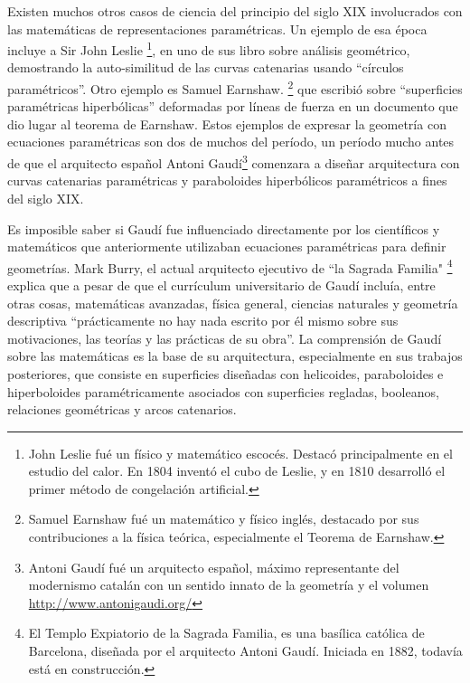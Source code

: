 Existen muchos otros casos de ciencia del principio del siglo XIX involucrados con las matemáticas de representaciones paramétricas. Un ejemplo de esa época incluye a Sir John Leslie \footnote{John Leslie fué un físico y matemático escocés. Destacó principalmente en el estudio del calor. En 1804 inventó el cubo de Leslie, y en 1810 desarrolló el primer método de congelación artificial.}, en uno de sus libro sobre análisis geométrico, demostrando la auto-similitud de las curvas catenarias usando ``círculos paramétricos''. Otro ejemplo es Samuel Earnshaw. \footnote{Samuel Earnshaw fué un matemático y físico inglés, destacado por sus contribuciones a la física teórica, especialmente el Teorema de Earnshaw.} que escribió sobre ``superficies paramétricas hiperbólicas'' deformadas por líneas de fuerza en un documento que dio lugar al teorema de Earnshaw. Estos ejemplos de expresar la geometría con ecuaciones paramétricas son dos de muchos del período, un período mucho antes de que el arquitecto español Antoni Gaudí\footnote{Antoni Gaudí fué un arquitecto español, máximo representante del modernismo catalán con un sentido innato de la geometría y el volumen \url{http://www.antonigaudi.org/} } comenzara a diseñar arquitectura con curvas catenarias paramétricas y paraboloides hiperbólicos paramétricos a fines del siglo XIX.

Es imposible saber si Gaudí fue influenciado directamente por los científicos y matemáticos que anteriormente utilizaban ecuaciones paramétricas para definir geometrías. 
Mark Burry, el actual arquitecto ejecutivo de ``la Sagrada Familia" \footnote{El Templo Expiatorio de la Sagrada Familia, es una basílica católica de Barcelona, diseñada por el arquitecto Antoni Gaudí. Iniciada en 1882, todavía está en construcción.} explica que a pesar de que el currículum universitario de Gaudí incluía, entre otras cosas, matemáticas avanzadas, física general, ciencias naturales y geometría descriptiva ``prácticamente no hay nada escrito por él mismo sobre sus motivaciones, las teorías y las prácticas de su obra''. La comprensión de Gaudí sobre las matemáticas es la base de su arquitectura, especialmente en sus trabajos posteriores, que consiste en superficies diseñadas con helicoides, paraboloides e hiperboloides paramétricamente asociados con superficies regladas, booleanos, relaciones geométricas y arcos catenarios.


